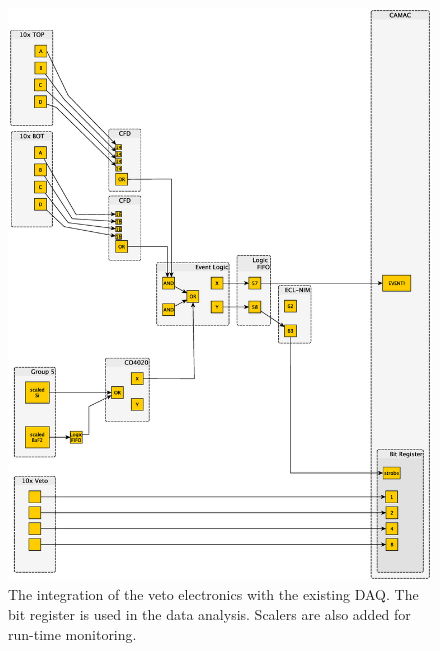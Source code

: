 \begin{figure}[!htbp]
\centering
\includegraphics[width=1.0\textwidth]{figures/electronics_veto.eps}
\caption[Diagram of the detector electronics with the veto signals included.]{The integration of the veto electronics with the existing DAQ.  The bit register is used in the data analysis.  Scalers are also added for run-time monitoring.}
\label{fig:vetoElectronics}
\end{figure}
 


